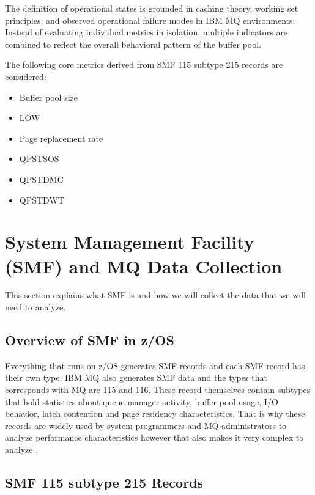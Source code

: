 The definition of operational states is grounded in caching theory, working set principles, and observed operational failure modes in IBM MQ environments. Instead of evaluating individual metrics in isolation, multiple indicators are combined to reflect the overall behavioral pattern of the buffer pool.

The following core metrics derived from SMF 115 subtype 215 records are considered:

\begin{itemize}
    \item Buffer pool size
    \item LOW
    \item Page replacement rate
    \item QPSTSOS
    \item QPSTDMC
    \item QPSTDWT
\end{itemize}

\autocite{Paice2020}
\autocite{ibm2020_mq_smf_intro}

\section{System Management Facility (SMF) and MQ Data Collection}%
\label{sec:smf}

This section explains what SMF is and how we will collect the data that we will need to analyze.


\subsection{Overview of SMF in z/OS}%
\label{subsec:smf-overview}

Everything that runs on z/OS generates SMF records and each SMF record has their own type.
IBM MQ also generates SMF data and the types that corresponds with MQ are 115 and 116. These record themselves contain subtypes 
that hold statistics about queue manager activity, buffer pool usage, I/O behavior, latch contention and page
residency characteristics. \autocite{ibm2025_mq_smf}
That is why these records are widely used by system programmers and MQ administrators to analyze performance characteristics however that also makes
it very complex to analyze
\autocite{Vasquez2024}.

\subsection{SMF 115 subtype 215 Records}%
\label{subsec:smf115116}

